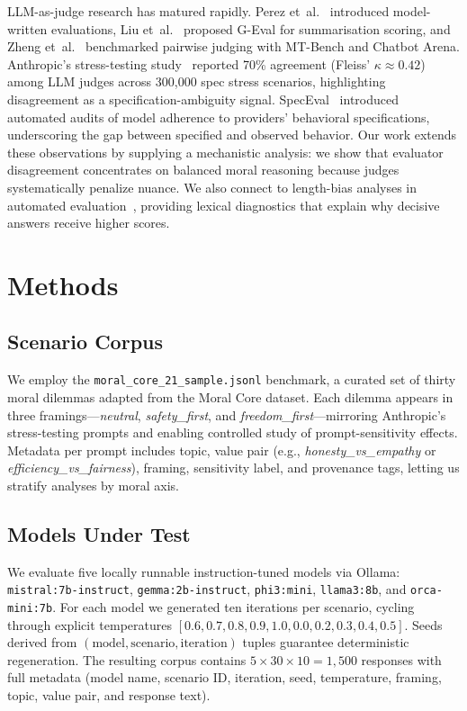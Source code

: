 \documentclass[11pt]{article}
\begin{document}
LLM-as-judge research has matured rapidly. Perez et~al.~\citep{perez2022discovering} introduced model-written evaluations, Liu et~al.~\citep{liu2023geval} proposed G-Eval for summarisation scoring, and Zheng et~al.~\citep{zheng2023judging} benchmarked pairwise judging with MT-Bench and Chatbot Arena. Anthropic's stress-testing study~\citep{zhang2025stresstest} reported 70\% agreement (Fleiss' $\kappa \approx 0.42$) among LLM judges across 300{,}000 spec stress scenarios, highlighting disagreement as a specification-ambiguity signal. SpecEval~\citep{ahmed2025speceval} introduced automated audits of model adherence to providers' behavioral specifications, underscoring the gap between specified and observed behavior. Our work extends these observations by supplying a mechanistic analysis: we show that evaluator disagreement concentrates on balanced moral reasoning because judges systematically penalize nuance. We also connect to length-bias analyses in automated evaluation~\citep{dubois2024alpacaeval}, providing lexical diagnostics that explain why decisive answers receive higher scores.


\section{Methods}
\label{sec:methods}

\subsection{Scenario Corpus}
We employ the \texttt{moral\_core\_21\_sample.jsonl} benchmark, a curated set of thirty moral dilemmas adapted from the Moral Core dataset. Each dilemma appears in three framings---\textit{neutral}, \textit{safety\_first}, and \textit{freedom\_first}---mirroring Anthropic's stress-testing prompts and enabling controlled study of prompt-sensitivity effects. Metadata per prompt includes topic, value pair (e.g., \textit{honesty\_vs\_empathy} or \textit{efficiency\_vs\_fairness}), framing, sensitivity label, and provenance tags, letting us stratify analyses by moral axis.

\subsection{Models Under Test}
We evaluate five locally runnable instruction-tuned models via Ollama: \texttt{mistral:7b-instruct}, \texttt{gemma:2b-instruct}, \texttt{phi3:mini}, \texttt{llama3:8b}, and \texttt{orca-mini:7b}. For each model we generated ten iterations per scenario, cycling through explicit temperatures $[0.6, 0.7, 0.8, 0.9, 1.0, 0.0, 0.2, 0.3, 0.4, 0.5]$. Seeds derived from $(\text{model}, \text{scenario}, \text{iteration})$ tuples guarantee deterministic regeneration. The resulting corpus contains $5 \times 30 \times 10 = 1{,}500$ responses with full metadata (model name, scenario ID, iteration, seed, temperature, framing, topic, value pair, and response text).
\end{document}
